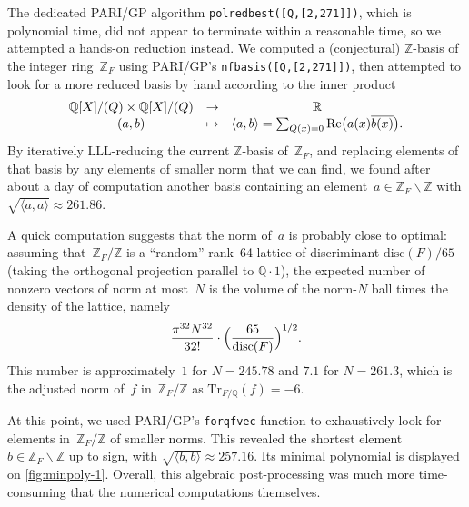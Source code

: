 \documentclass[12pt,oneside]{amsart}
\numberwithin{equation}{section}
\theoremstyle{definition}
\newcommand{\Z}{\mathbb{Z}}
\newcommand{\R}{\mathbb{R}}
\newcommand{\Q}{\mathbb{Q}}
\DeclareMathOperator{\re}{Re}
\DeclarePairedDelimiter{\paren}{(}{)}
\begin{document}
The dedicated PARI/GP algorithm \texttt{polredbest([Q,[2,271]])}, which is
polynomial time, did not appear to terminate within a reasonable time, so we
attempted a hands-on reduction instead. We computed a (conjectural) $\Z$-basis
of the integer ring~$\Z_F$ using PARI/GP's \texttt{nfbasis([Q,[2,271]])}, then
attempted to look for a more reduced basis by hand according to the inner
product
\begin{equation}
  \begin{matrix}
    \Q[X]/(Q) \times \Q[X]/(Q)&\to &\R\\
    (a,b) &\mapsto &\langle a,b\rangle = \sum_{Q(x)=0} \re\paren[\big]{a(x) \overline{b(x)}}.
  \end{matrix}
\end{equation}
By iteratively LLL-reducing the current $\Z$-basis of~$\Z_F$, and replacing
elements of that basis by any elements of smaller norm that we can find, we
found after about a day of computation another basis containing an
element~$a\in \Z_F\backslash\Z$ with $\sqrt{\langle a,a\rangle}\approx
261.86$.

A quick computation suggests that the norm of~$a$ is probably close to optimal:
assuming that~$\Z_F/\Z$ is a ``random'' rank~64 lattice of discriminant
$\mathrm{disc}(F)/65$ (taking the orthogonal projection parallel to
$\Q\cdot 1$), the expected number of nonzero vectors of norm at most~$N$ is the
volume of the norm-$N$ ball times the density of the lattice, namely
\begin{displaymath}
  \frac{\pi^{32} N^{32}}{32!} \cdot \paren[\Big]{\frac{65}{\mathrm{disc}(F)}}^{1/2}.
\end{displaymath}
This number is approximately~$1$ for $N=245.78$ and $7.1$ for $N=261.3$, which
is the adjusted norm of~$f$ in~$\Z_F/\Z$ as $\mathrm{Tr}_{F/\Q}(f) = -6$.

At this point, we used PARI/GP's \texttt{forqfvec} function to exhaustively
look for elements in~$\Z_F/\Z$ of smaller norms. This revealed the shortest
element~$b\in \Z_F\backslash\Z$ up to sign, with
$\sqrt{\langle b,b\rangle}\approx 257.16$. Its minimal polynomial is displayed
on \cref{fig:minpoly-1}. Overall, this algebraic post-processing was much more
time-consuming that the numerical computations themselves.
\end{document}
